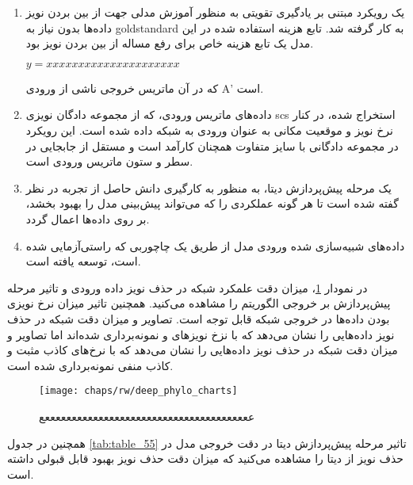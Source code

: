\begin{enumerate}
	\item     یک رویکرد مبتنی بر یادگیری تقویتی به منظور آموزش مدلی جهت از بین بردن نویز داده‌ها بدون نیاز به \gls{goldstandard} به کار گرفته شد. تابع هزینه استفاده شده در این مدل یک تابع هزینه خاص برای رفع مساله از بین بردن نویز بود. 
    
    \begin{math}
    	y=xxxxxxxxxxxxxxxxxxxxx
    \end{math}

که در آن  ماتریس خروجی ناشی از ورودی A’ است. 
\item     داده‌های ماتریس ورودی، که از مجموعه دادگان نویزی \gls{scs} استخراج شده، در کنار نرخ نویز و موقعیت مکانی به عنوان ورودی به شبکه داده شده است.  این رویکرد در مجموعه دادگانی با سایز متفاوت همچنان کارآمد است و مستقل از جابجایی در سطر و ستون ماتریس ورودی است. 
\item یک مرحله پیش‌پردازش دیتا، به منظور به کارگیری دانش حاصل از تجربه در نظر گفته شده است تا هر گونه عملکردی را  که می‌تواند پیش‌بینی مدل را بهبود بخشد، بر روی داده‌ها اعمال گردد. 
\item داده‌های شبیه‌سازی شده ورودی مدل از طریق یک چاچوربی که راستی‌آزمایی شده است، توسعه یافته است. 
\end{enumerate}

در نمودار \ref{fig:ch_rw:deep_phylo_charts}، میزان دقت علمکرد شبکه در حذف نویز داده ورودی و تاثیر مرحله پیش‌پردازش بر خروجی الگوریتم را مشاهده می‌کنید. همچنین تاثیر میزان نرخ نویزی بودن داده‌ها در خروجی شبکه قابل توجه است. تصاویر  و  میزان دقت شبکه در حذف نویز داده‌هایی را نشان می‌دهد که با نزخ نویزهای   و  نمونه‌برداری شده‌اند اما  تصاویر  و  میزان دقت شبکه در حذف نویز داده‌هایی را نشان می‌دهد که با نرخ‌های کاذب مثبت  و کاذب منفی  نمونه‌برداری شده است.  


\begin{figure}[!ht]
	\centerline{\texttt{[image: chaps/rw/deep\_phylo\_charts]}}
	\caption{عععععععععععععععععععععععععععععععععععععععع}
	\label{fig:ch_rw:deep_phylo_charts}
\end{figure}

همچنین در جدول \ref{tab:table_55} تاثیر مرحله پیش‌پردازش دیتا در دقت خروجی مدل در حذف نویز از دیتا را مشاهده می‌کنید که میزان دقت حذف نویز بهبود قابل قبولی داشته است. 

